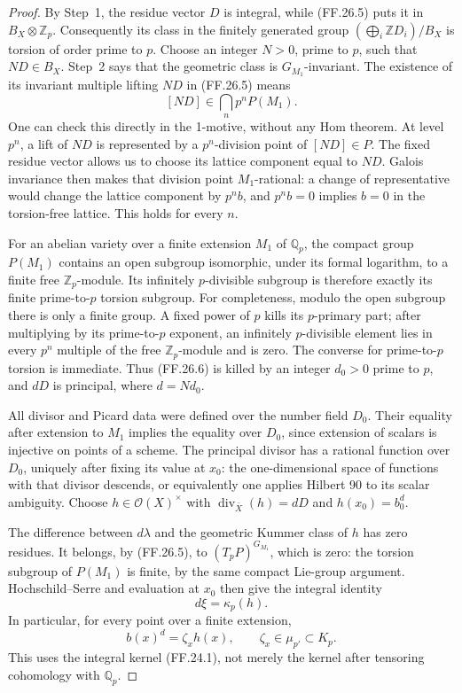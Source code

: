 \begin{proof}
By Step~1, the residue vector \(D\) is integral, while
(FF.26.5) puts it in \(B_X\otimes\mathbb Z_p\).
Consequently its class in the finitely generated group
\((\bigoplus_i\mathbb ZD_i)/B_X\) is torsion of order
prime to \(p\). Choose an integer \(N>0\), prime
to \(p\), such that \(ND\in B_X\).
Step~2 says that the geometric class is
\(G_{M_1}\)-invariant. The existence of its invariant
multiple lifting \(ND\) in (FF.26.5) means
\[
                 [ND]\in\bigcap_n p^nP(M_1).           \tag{FF.26.6}
\]
One can check this directly in the 1-motive, without
any Hom theorem. At level \(p^n\), a lift of \(ND\)
is represented by a \(p^n\)-division point of
\([ND]\in P\). The fixed residue vector allows us
to choose its lattice component equal to \(ND\).
Galois invariance then makes that division point
\(M_1\)-rational: a change of representative would
change the lattice component by \(p^n b\), and
\(p^n b=0\) implies \(b=0\) in the torsion-free
lattice. This holds for every \(n\).

For an abelian variety over a finite extension \(M_1\)
of \(\mathbb Q_p\), the compact group \(P(M_1)\)
contains an open subgroup isomorphic, under its formal
logarithm, to a finite free \(\mathbb Z_p\)-module.
Its infinitely \(p\)-divisible subgroup is therefore
exactly its finite prime-to-\(p\) torsion subgroup.
For completeness, modulo the open subgroup there is
only a finite group. A fixed power of \(p\) kills
its \(p\)-primary part; after multiplying by its
prime-to-\(p\) exponent, an infinitely \(p\)-divisible
element lies in every \(p^n\) multiple of the free
\(\mathbb Z_p\)-module and is zero. The converse for
prime-to-\(p\) torsion is immediate.
Thus (FF.26.6) is killed by an integer \(d_0>0\)
prime to \(p\), and \(dD\) is principal, where
\(d=Nd_0\).

All divisor and Picard data were defined over the
number field \(D_0\). Their equality after extension
to \(M_1\) implies the equality over \(D_0\), since
extension of scalars is injective on points of a scheme.
The principal divisor has a rational function over
\(D_0\), uniquely after fixing its value at \(x_0\):
the one-dimensional space of functions with that divisor
descends, or equivalently one applies Hilbert 90 to its
scalar ambiguity. Choose
\(h\in\mathcal O(X)^\times\) with
\(\operatorname{div}_{\bar X}(h)=dD\) and
\(h(x_0)=b_0^d\).

The difference between \(d\lambda\) and the geometric
Kummer class of \(h\) has zero residues. It belongs,
by (FF.26.5), to \((T_pP)^{G_{M_1}}\), which is zero:
the torsion subgroup of \(P(M_1)\) is finite, by
the same compact Lie-group argument. Hochschild--Serre
and evaluation at \(x_0\) then give the integral identity
\[
                         d\xi=\kappa_p(h).              \tag{FF.26.7}
\]
In particular, for every point over a finite extension,
\[
                         b(x)^d=\zeta_xh(x),
                         \qquad\zeta_x\in\mu_{p'}\subset K_p.
                                                               \tag{FF.26.8}
\]
This uses the integral kernel (FF.24.1), not merely
the kernel after tensoring cohomology with \(\mathbb Q_p\).


\end{proof}
